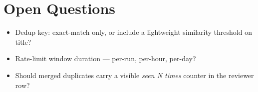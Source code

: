 \section{Open Questions}
\begin{itemize}[leftmargin=1.2em]
  \item Dedup key: exact-match only, or include a lightweight similarity threshold on title?
  \item Rate-limit window duration --- per-run, per-hour, per-day?
  \item Should merged duplicates carry a visible \emph{seen N times} counter in the reviewer row?
\end{itemize}


